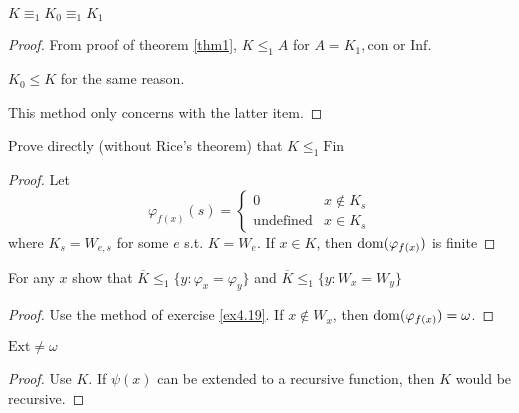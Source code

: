 \documentclass[11pt]{article}
\begin{document}
\begin{exercise}
\(K\equiv_1 K_0\equiv_1 K_1\)
\end{exercise}
\begin{proof}
From proof of theorem \ref{thm1}, \(K\le_1 A\) for \(A=K_1,\text{con}\) or
\(\text{Inf}\).

\(K_0\le K\) for the same reason.

This method only concerns with the latter item.
\end{proof}

\begin{exercise}
\label{ex4.19}
Prove directly (without Rice's theorem) that \(K\le_1\text{Fin}\)
\end{exercise}
\begin{proof}
Let
\begin{equation*}
\varphi_{f(x)}(s)=
\begin{cases}
0&x\not\in K_s\\
\text{undefined}&x\in K_s
\end{cases}
\end{equation*}
where \(K_s=W_{e,s}\) for some \(e\) s.t. \(K=W_e\). If \(x\in K\), then
\(\mathrm{dom}{(\varphi_{f(x)})}\) is finite
\end{proof}
\begin{exercise}
For any \(x\) show that \(\overline{K}\le_1\{y:\varphi_x=\varphi_y\}\) and
\(\overline{K}\le_1\{y:W_x=W_y\}\) 
\end{exercise}
\begin{proof}
Use the method of exercise \ref{ex4.19}. If \(x\not\in W_x\), then
\(\mathrm{dom}{(\varphi_{f(x)})}=\omega\).
\end{proof}
\begin{exercise}
\(\text{Ext}\neq\omega\)
\end{exercise}
\begin{proof}
Use \(K\). If \(\psi(x)\) can be extended to a recursive function, then \(K\) would
be recursive.
\end{proof}
\end{document}
